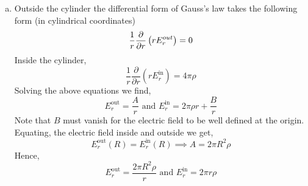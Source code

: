 \documentclass{esg8022pset}
\newcommand{\dr}{\frac{\partial}{\partial r}}
\begin{document}
\begin{solution}
\begin{enumerate}[(a)]
      
    \item Outside the cylinder the differential form of Gauss's law takes the following form (in cylindrical coordinates)
      $$\frac{1}{r} \frac{\partial}{\partial r} \left( r E^{\mbox{\tiny out}}_r \right)  = 0$$
      Inside the cylinder,
      $$\frac{1}{r} \dr \left( r E^{\text{in}}_r \right)  = 4 \pi \rho$$
      Solving the above equations we find,
      $$E^{\text{out}}_r = \frac{A}{r}\mbox{ and }E^{\text{in}}_r = 2\pi \rho r + \frac{B}{r}$$
      Note that $B$ must vanish for the electric field to be well defined at the origin. Equating, the electric field inside and outside we get,
      $$E^{\text{out}}_r(R) = E^{\text{in}}_r(R) \implies A = 2\pi R^2 \rho$$
      Hence,
      $$E^{\text{out}}_r = \frac{2\pi R^2 \rho}{r} \text{ and } E^{\text{in}}_r=2\pi r \rho$$
  \end{enumerate}
\end{solution}
\end{document}
